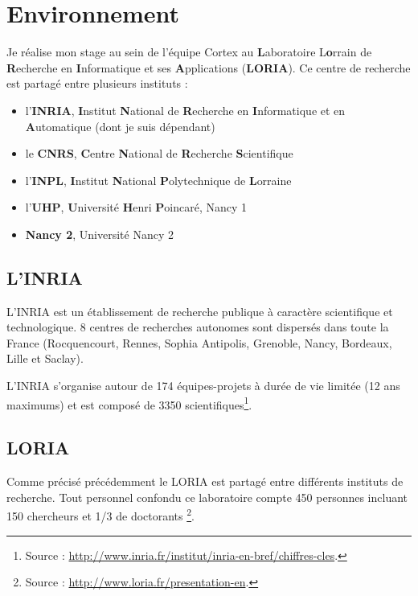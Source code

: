 \chapter{Environnement} %
\label{cha:Environnement}

Je réalise mon stage au sein de l'équipe Cortex au \textbf{L}aboratoire L\textbf{o}rrain de
\textbf{R}echerche en \textbf{I}nformatique et ses \textbf{A}pplications (\textbf{LORIA}).
Ce centre de recherche est partagé entre plusieurs instituts :
\begin{itemize}
   \item l'\textbf{INRIA}, \textbf{I}nstitut \textbf{N}ational de \textbf{R}echerche en \textbf{I}nformatique
      et en \textbf{A}utomatique (dont je suis dépendant)
   \item le \textbf{CNRS}, \textbf{C}entre \textbf{N}ational de \textbf{R}echerche \textbf{S}cientifique
   \item l'\textbf{INPL}, \textbf{I}nstitut \textbf{N}ational \textbf{P}olytechnique de \textbf{L}orraine
   \item l'\textbf{UHP}, \textbf{U}niversité \textbf{H}enri \textbf{P}oincaré, Nancy 1
   \item \textbf{Nancy 2}, Université Nancy 2
\end{itemize}

\section{L'INRIA} %
\label{sec:L'INRIA}

L'INRIA est un établissement de recherche publique à caractère scientifique et technologique. 8 centres de
recherches autonomes sont dispersés dans toute la France (Rocquencourt, Rennes, Sophia Antipolis, Grenoble,
Nancy, Bordeaux, Lille et Saclay).

L'INRIA s'organise autour de 174 équipes-projets à durée de vie limitée (12 ans maximums) et est composé
de 3350 scientifiques\footnote{Source : \url{http://www.inria.fr/institut/inria-en-bref/chiffres-cles}.}.


\section{LORIA} %
\label{sec:LORIA}

Comme précisé précédemment le LORIA est partagé entre différents instituts de recherche. Tout personnel confondu
ce laboratoire compte 450 personnes incluant 150 chercheurs et 1/3 de doctorants
\footnote{Source : \url{http://www.loria.fr/presentation-en}.}.

